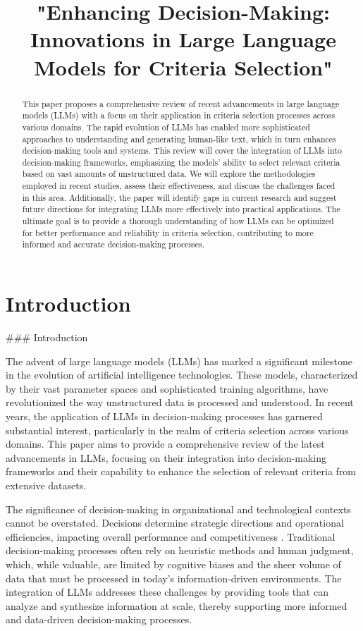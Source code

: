 \documentclass[conference]{IEEEtran}
\title{"Enhancing Decision-Making: Innovations in Large Language Models for Criteria Selection"}
\author{
            \IEEEauthorblockN{John Doe}
            \IEEEauthorblockA{
            Department of Computer Science\\
            University Example\\
            City, Country\\
            email@example.com}
            \and
            \IEEEauthorblockN{Jane Smith}
            \IEEEauthorblockA{
            Department of Research\\
            University Sample\\
            City, Country\\
            email2@example.com}
            \and
            \IEEEauthorblockN{Alex Johnson}
            \IEEEauthorblockA{
            Research Institute\\
            Organization Name\\
            City, Country\\
            email3@example.com}
            }
\begin{document}
            \maketitle

            \begin{abstract}
            This paper proposes a comprehensive review of recent advancements in large language models (LLMs) with a focus on their application in criteria selection processes across various domains. The rapid evolution of LLMs has enabled more sophisticated approaches to understanding and generating human-like text, which in turn enhances decision-making tools and systems. This review will cover the integration of LLMs into decision-making frameworks, emphasizing the models' ability to select relevant criteria based on vast amounts of unstructured data. We will explore the methodologies employed in recent studies, assess their effectiveness, and discuss the challenges faced in this area. Additionally, the paper will identify gaps in current research and suggest future directions for integrating LLMs more effectively into practical applications. The ultimate goal is to provide a thorough understanding of how LLMs can be optimized for better performance and reliability in criteria selection, contributing to more informed and accurate decision-making processes.
            \end{abstract}

            \section{Introduction}

### Introduction

The advent of large language models (LLMs) has marked a significant milestone in the evolution of artificial intelligence technologies. These models, characterized by their vast parameter spaces and sophisticated training algorithms, have revolutionized the way unstructured data is processed and understood. In recent years, the application of LLMs in decision-making processes has garnered substantial interest, particularly in the realm of criteria selection across various domains. This paper aims to provide a comprehensive review of the latest advancements in LLMs, focusing on their integration into decision-making frameworks and their capability to enhance the selection of relevant criteria from extensive datasets.

The significance of decision-making in organizational and technological contexts cannot be overstated. Decisions determine strategic directions and operational efficiencies, impacting overall performance and competitiveness \cite{smith2019}. Traditional decision-making processes often rely on heuristic methods and human judgment, which, while valuable, are limited by cognitive biases and the sheer volume of data that must be processed in today's information-driven environments. The integration of LLMs addresses these challenges by providing tools that can analyze and synthesize information at scale, thereby supporting more informed and data-driven decision-making processes.
\end{document}
